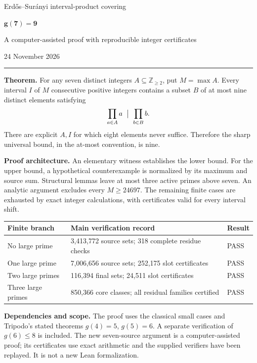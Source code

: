 \documentclass[11pt,a4paper]{article}
\begin{document}
\thispagestyle{empty}
\vspace*{10mm}
{\Large\sffamily Erd\H{o}s--Sur\'anyi interval-product covering}\par
\vspace{6mm}
{\Huge\bfseries $\boldsymbol{g(7)=9}$}\par
\vspace{4mm}
{\large A computer-assisted proof with reproducible integer certificates}\par
\vspace{4mm}
24 November 2026\par
\vspace{7mm}
\hrule
\vspace{6mm}
\textbf{Theorem.} For any seven distinct integers $A\subseteq\mathbb Z_{\ge2}$,
put $M=\max A$. Every interval $I$ of $M$ consecutive positive integers
contains a subset $B$ of at most nine distinct elements satisfying
\[
       \prod_{a\in A}a\ \bigm|\ \prod_{b\in B}b.
\]
There are explicit $A,I$ for which eight elements never suffice.
Therefore the sharp universal bound, in the at-most convention, is nine.

\textbf{Proof architecture.} An elementary witness establishes the lower
bound. For the upper bound, a hypothetical counterexample is normalized
by its maximum and source sum. Structural lemmas leave at most three
active primes above seven. An analytic argument excludes every
$M\ge24697$. The remaining finite cases are exhausted by exact integer
calculations, with certificates valid for every interval shift.

\begin{center}
\begin{tabular}{p{32mm}p{82mm}l}
\toprule
Finite branch & Main verification record & Result\\
\midrule
No large prime & 3,413,772 source sets; 318 complete residue checks & PASS\\
One large prime & 7,006,656 source sets; 252,175 slot certificates & PASS\\
Two large primes & 116,394 final sets; 24,511 slot certificates & PASS\\
Three large primes & 850,366 core classes; all residual families certified & PASS\\
\bottomrule
\end{tabular}
\end{center}

\textbf{Dependencies and scope.} The proof uses the classical small cases
and Tripodo's stated theorems $g(4)=5$, $g(5)=6$. A separate verification of
$g(6)\le8$ is included. The new seven-source argument is a computer-assisted
proof; its certificates use exact arithmetic and the supplied verifiers
have been replayed. It is not a new Lean formalization.
\end{document}
